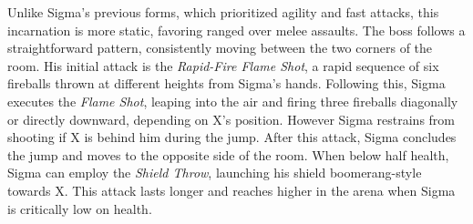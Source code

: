 Unlike Sigma's previous forms, which prioritized agility and fast attacks, this incarnation is more static, favoring ranged over melee assaults. The boss follows a straightforward pattern, consistently moving between the two corners of the room. His initial attack is the \emph{Rapid-Fire Flame Shot}, a rapid sequence of six fireballs thrown at different heights from Sigma's hands. Following this, Sigma executes the \emph{Flame Shot}, leaping into the air and firing three fireballs diagonally or directly downward, depending on X's position. However Sigma restrains from shooting if X is behind him during the jump. After this attack, Sigma concludes the jump and moves to the opposite side of the room. When below half health, Sigma can employ the \emph{Shield Throw}, launching his shield boomerang-style towards X. This attack lasts longer and reaches higher in the arena when Sigma is critically low on health.

